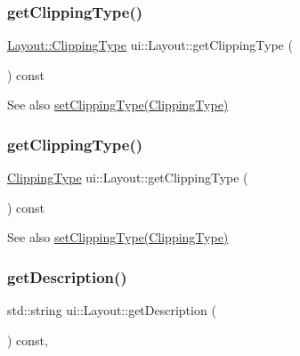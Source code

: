\subsubsection{\texorpdfstring{get\+Clipping\+Type()}{getClippingType()}\hspace{0.1cm}{\footnotesize\ttfamily [1/2]}}
{\footnotesize\ttfamily \hyperlink{classui_1_1Layout_acd2a398e83d7d467e9565d4db171c865}{Layout\+::\+Clipping\+Type} ui\+::\+Layout\+::get\+Clipping\+Type (\begin{DoxyParamCaption}{ }\end{DoxyParamCaption}) const}

\begin{DoxySeeAlso}{See also}
{\ttfamily \hyperlink{classui_1_1Layout_aed2e7279ffe4d9fda5820917a36b71db}{set\+Clipping\+Type(\+Clipping\+Type)}} 
\end{DoxySeeAlso}
\mbox{\label{classui_1_1Layout_a015458636724242eff0c903363121c63}} 
\subsubsection{\texorpdfstring{get\+Clipping\+Type()}{getClippingType()}\hspace{0.1cm}{\footnotesize\ttfamily [2/2]}}
{\footnotesize\ttfamily \hyperlink{classui_1_1Layout_acd2a398e83d7d467e9565d4db171c865}{Clipping\+Type} ui\+::\+Layout\+::get\+Clipping\+Type (\begin{DoxyParamCaption}{ }\end{DoxyParamCaption}) const}

\begin{DoxySeeAlso}{See also}
{\ttfamily \hyperlink{classui_1_1Layout_aed2e7279ffe4d9fda5820917a36b71db}{set\+Clipping\+Type(\+Clipping\+Type)}} 
\end{DoxySeeAlso}
\mbox{\label{classui_1_1Layout_a3fdf14a50462dff31ec875b28e223c7f}} 
\subsubsection{\texorpdfstring{get\+Description()}{getDescription()}\hspace{0.1cm}{\footnotesize\ttfamily [1/2]}}
{\footnotesize\ttfamily std\+::string ui\+::\+Layout\+::get\+Description (\begin{DoxyParamCaption}{ }\end{DoxyParamCaption}) const\hspace{0.3cm}{\ttfamily [override]}, {\ttfamily [virtual]}}

